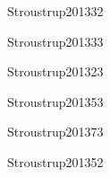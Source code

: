 \begin{syllabus}
\begin{unit}{\ALBasicAnalysisDef}{Stroustrup2013}{3}{2}
   \begin{topics}
      \item \ALBasicAnalysisTopicAsymptotic
      \item \ALBasicAnalysisTopicIdentifying
   \end{topics}
   \begin{learningoutcomes}
      \item \ALBasicAnalysisObjTHREE
   \end{learningoutcomes}
\end{unit}

\begin{unit}{\ALFundamentalAlgorithmsDef}{Stroustrup2013}{3}{3}
    \ALFundamentalAlgorithmsAllTopics
    \ALFundamentalAlgorithmsAllObjectives
\end{unit}

\begin{unit}{\PLDeclarationsAndTypesDef}{Stroustrup2013}{2}{3}
    \PLDeclarationsAndTypesAllTopics
    \PLDeclarationsAndTypesAllObjectives
\end{unit}

\begin{unit}{\PLAbstractionMechanismsDef}{Stroustrup2013}{5}{3}
    \PLAbstractionMechanismsAllTopics
    \PLAbstractionMechanismsAllTopics
\end{unit}

\begin{unit}{\PLObjectOrientedProgrammingDef}{Stroustrup2013}{7}{3}
    \PLObjectOrientedProgrammingAllTopics
    \PLObjectOrientedProgrammingAllObjectives
\end{unit}

\begin{unit}{\SESoftwareDesignDef}{Stroustrup2013}{5}{2}
   \begin{topics}
	\item \SESoftwareDesignTopicFundamental%
	\item \SESoftwareDesignTopicTherole%
	\item \SESoftwareDesignTopicDesignPatterns%
   \end{topics}
   \begin{learningoutcomes}
      \item \SESoftwareDesignObjONE
      \item \SESoftwareDesignObjFIVE
   \end{learningoutcomes}
\end{unit}


\end{syllabus}
